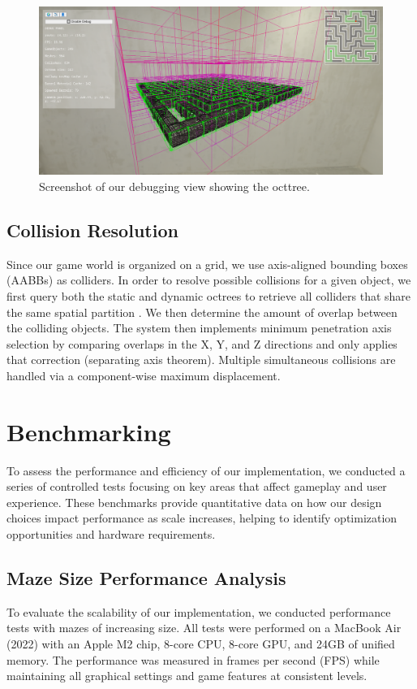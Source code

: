 \documentclass{article}
\begin{document}
\begin{figure}[H]
    \centering
    \includegraphics[width=\textwidth]{diagrams/octree.png}
    \caption{Screenshot of our debugging view showing the octtree.}
    \label{fig:octree}
\end{figure}

\subsection{Collision Resolution}

Since our game world is organized on a grid, we use axis-aligned bounding boxes
(AABBs) as colliders. In order to resolve possible collisions for a given
object, we first query both the static and dynamic octrees to retrieve all
colliders that share the same spatial partition . We then determine the amount
of overlap between the colliding objects. The system then implements minimum
penetration axis selection by comparing overlaps in the X, Y, and Z directions
and only applies that correction (separating axis theorem). Multiple
simultaneous collisions are handled via a component-wise maximum displacement.

\section{Benchmarking}\label{sec:benchmarking}
To assess the performance and efficiency of our implementation, we conducted a
series of controlled tests focusing on key areas that affect gameplay and user
experience. These benchmarks provide quantitative data on how our design
choices impact performance as scale increases, helping to identify optimization
opportunities and hardware requirements.

\subsection{Maze Size Performance Analysis}
To evaluate the scalability of our implementation, we conducted performance tests with mazes of increasing size. All tests were performed on a MacBook Air (2022) with an Apple M2 chip, 8-core CPU, 8-core GPU, and 24GB of unified memory. The performance was measured in frames per second (FPS) while maintaining all graphical settings and game features at consistent levels.
\end{document}
